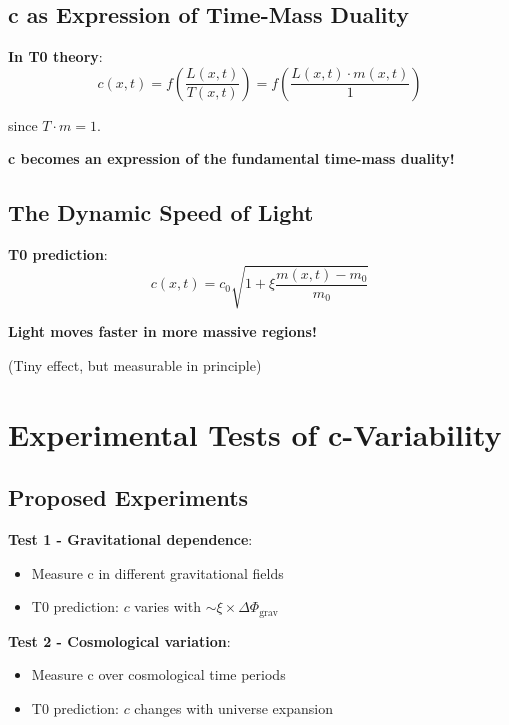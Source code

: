\documentclass[12pt,a4paper]{article}
\newcommand{\Tfield}{T}
\newcommand{\xipar}{\xi}
\begin{document}
	\subsection{c as Expression of Time-Mass Duality}
	
	\textbf{In T0 theory}:
	\begin{equation}
		c(x,t) = f\left(\frac{L(x,t)}{\Tfield(x,t)}\right) = f\left(\frac{L(x,t) \cdot m(x,t)}{1}\right)
	\end{equation}
	
	since $\Tfield \cdot m = 1$.
	
	\textbf{c becomes an expression of the fundamental time-mass duality!}
	
	\subsection{The Dynamic Speed of Light}
	
	\textbf{T0 prediction}: 
	\begin{equation}
		c(x,t) = c_0 \sqrt{1 + \xipar \frac{m(x,t) - m_0}{m_0}}
	\end{equation}
	
	\textbf{Light moves faster in more massive regions!}
	
	(Tiny effect, but measurable in principle)
	
	\section{Experimental Tests of c-Variability}
	
	\subsection{Proposed Experiments}
	
	\textbf{Test 1 - Gravitational dependence}:
	\begin{itemize}
		\item Measure c in different gravitational fields
		\item T0 prediction: $c$ varies with $\sim \xipar \times \Delta\Phi_{\text{grav}}$
	\end{itemize}
	
	\textbf{Test 2 - Cosmological variation}:
	\begin{itemize}
		\item Measure c over cosmological time periods
		\item T0 prediction: $c$ changes with universe expansion
	\end{itemize}
	
\end{document}
